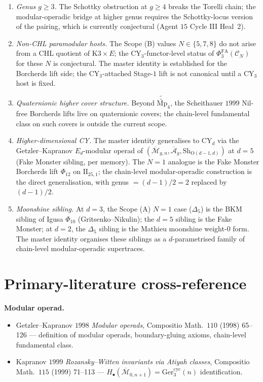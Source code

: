 \documentclass[11pt]{amsart}
\providecommand{\cC}{\mathcal{C}}
\providecommand{\Mp}{\mathrm{Mp}}
\providecommand{\PhiFA}{\Phi^{\mathrm{FA}}}
\providecommand{\Mbar}{\overline{\mathcal{M}}}
\providecommand{\Ger}{\mathrm{Ger}}
\begin{document}
\begin{enumerate}[label=\textup{(\arabic*)}]
\item \emph{Genus $g \geq 3$.} The Schottky obstruction at $g \geq 4$
breaks the Torelli chain; the modular-operadic bridge at higher genus
requires the Schottky-locus version of the pairing, which is
currently conjectural (Agent $15$ Cycle III Heal~2).
\item \emph{Non-CHL paramodular hosts.} The Scope (B) values
$N \in \{5, 7, 8\}$ do not arise from a CHL quotient of
$\mathrm{K3} \times E$; the CY$_3$-functor-level status of
$\PhiFA_3(\cC_N)$ for these $N$ is conjectural. The master identity
is established for the Borcherds lift side; the CY$_3$-attached
Stage-$1$ lift is not canonical until a CY$_3$ host is fixed.
\item \emph{Quaternionic higher cover structure.} Beyond
$\widetilde{\widetilde{\Mp}}_4$, the Scheithauer $1999$ Nil-free
Borcherds lifts live on quaternionic covers; the chain-level
fundamental class on such covers is outside the current scope.
\item \emph{Higher-dimensional CY.} The master identity generalises
to CY$_d$ via the Getzler--Kapranov $E_d$-modular operad of
$(\overline{\mathcal M}_{g, n}, \overline{\mathcal A}_g,
\mathrm{Sh}_{\mathrm{O}(d - 1, d)})$ at $d = 5$ (Fake Monster
sibling, per memory). The $N = 1$ analogue is the Fake Monster
Borcherds lift $\Phi_{12}$ on $\mathrm{II}_{25, 1}$; the chain-level
modular-operadic construction is the direct generalisation, with
genus $= (d - 1)/2 = 2$ replaced by $(d - 1)/2$.
\item \emph{Moonshine sibling.} At $d = 3$, the Scope (A) $N = 1$
case ($\Delta_5$) is the BKM sibling of Igusa $\Phi_{10}$
(Gritsenko--Nikulin); the $d = 5$ sibling is the Fake Monster; at
$d = 2$, the $\Delta_5$ sibling is the Mathieu moonshine weight-$0$
form. The master identity organises these siblings as a
$d$-parametrised family of chain-level modular-operadic supertraces.
\end{enumerate}

\section{Primary-literature cross-reference}
\label{sec:primary-lit}

\noindent\textbf{Modular operad.}
\begin{itemize}
\item Getzler--Kapranov $1998$ \emph{Modular operads}, Compositio
Math.~$110$ (1998) 65--126 --- definition of modular operads,
boundary-gluing axioms, chain-level fundamental class.
\item Kapranov $1999$ \emph{Rozansky--Witten invariants via
Atiyah classes}, Compositio Math.~$115$ (1999) 71--113 ---
$H_\bullet(\Mbar_{0, n + 1}) = \Ger^{\mathrm{cyc}}_3(n)$
identification.
\end{itemize}
\end{document}
